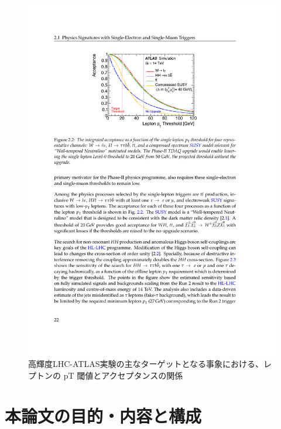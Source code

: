 \begin{figure} 
\centering
\includegraphics[width=16cm]{fig/Intro/Ptthreshold.pdf}
\caption[高輝度LHC-ATLAS実験の主なターゲットとなる事象における、レプトンの pT 閾値とアクセプタンスの関係]{高輝度LHC-ATLAS実験の主なターゲットとなる事象における、レプトンの pT 閾値とアクセプタンスの関係\cite{tdr_phase2tdaq_2017020}}
\label{Ptthreshold}
\end{figure}

\section{本論文の目的・内容と構成}
\label{sec_intro_purpose}





